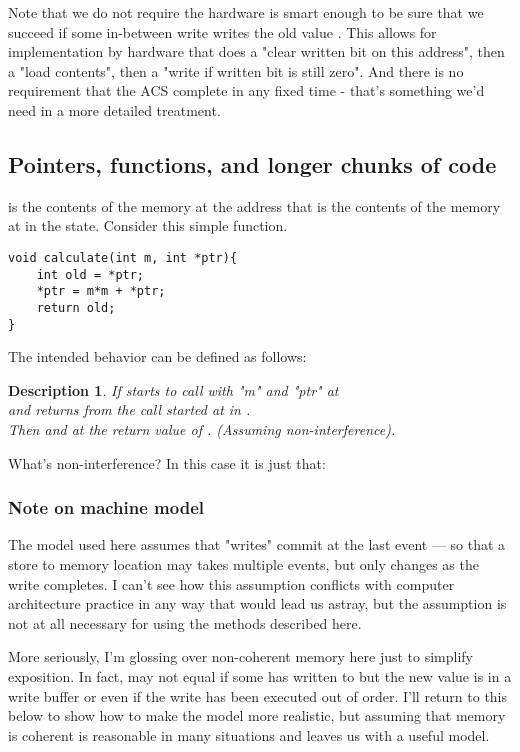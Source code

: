 \documentclass[english,11pt]{article}
\newtheorem{expl}{Description}[section]
\begin{document}
Note that we do not require the hardware is smart enough to be sure 
that we succeed if some in-between write writes the old value . This
allows for implementation by hardware that does a "clear written bit on
this address", then a "load contents", then a "write if written bit is still
zero". And there is no requirement that the ACS complete in any fixed time - that's something we'd need in a more detailed treatment.

\subsection{Pointers, functions, and longer chunks of code}
 is the contents of the memory at the address that
is the contents of the memory at  in the  state. Consider this simple function.

\lstset{language=c}
\begin{lstlisting}
void calculate(int m, int *ptr){
	int old = *ptr;
	*ptr = m*m + *ptr;	
	return old;
}
\end{lstlisting}

The intended behavior can be defined as follows:

\begin{expl}
If  starts to call  with "m"  and "ptr"   at \\
and  returns from the call started at  in .\\
Then  and at  the return value of  . (Assuming non-interference).
\end{expl}

What's non-interference? In this case it is just that:


\subsubsection{Note on machine model}
The model used here assumes that "writes" commit at the last event --- so that
a store to memory location  may takes multiple events, but  only changes as the write completes. I can't see how this assumption conflicts with computer architecture practice in any way that would lead us astray, but
the assumption is not at all necessary for using the methods described here.

More seriously, I'm glossing over non-coherent memory here just to simplify exposition. In fact,  may not equal  if some 
has written to  but the new value is in a write buffer or even if the
write has been executed out of order. I'll return to this below to show how to
make the model more realistic, but assuming
that memory is coherent is reasonable in many situations and leaves us with 
a useful model.
\end{document}
